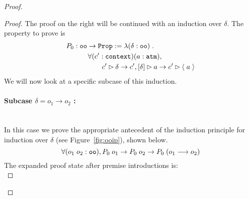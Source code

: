 \begin{proof}
\begin{proof}


The proof on the right will be continued with an induction over $\delta$. The property to prove is
\begin{align*}
P_0 &: \sltm{oo} \rightarrow \coqtm{Prop} := \lambda (\delta : \sltm{oo}) \; . \\
& \qquad \forall (\inddyncon{} : \sltm{context}) (a : \sltm{atm}), \\
& \qquad\qquad \seqsl[\inddyncon{}]{\delta} \rightarrow \bchsl[\inddyncon{}]{\delta}{a} \rightarrow \seqsl[\inddyncon{}]{\atom{a}}
\end{align*}
We will now look at a specific subcase of this induction. \\

\paragraph{Subcase $\delta = o_1 \longrightarrow o_2$ :} ~\\

In this case we prove the appropriate antecedent of the induction principle for induction over $\delta$ (see Figure~\ref{fig:ooip}), shown below.
$$
\forall (o_1 \; o_2 : \sltm{oo}), P_0 \; o_1 \rightarrow P_0 \; o_2 \rightarrow P_0 \; (o_1 \longrightarrow o_2)
$$
The expanded proof state after premise introductions is:\\


\end{proof}
\end{proof}
